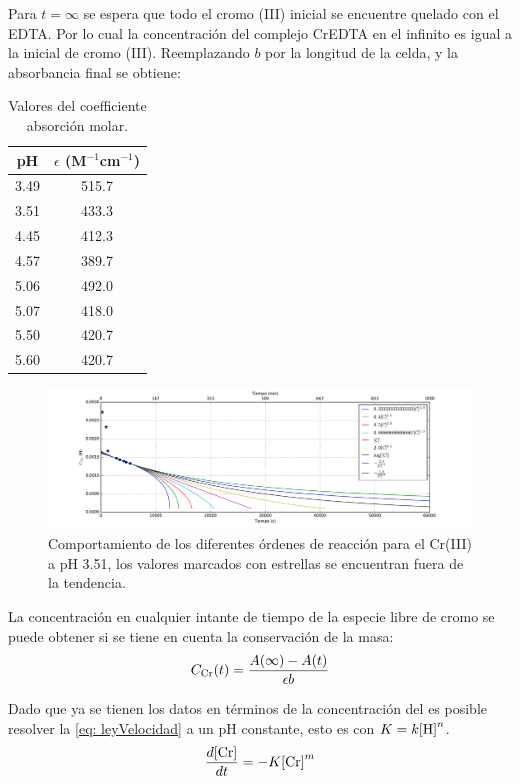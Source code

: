 \documentclass[fleqn,10pt]{SelfArx} %
\begin{document}
	Para $t = \infty$ se espera que todo el cromo (III) inicial se encuentre quelado con el EDTA. Por lo cual la concentraci\'on del complejo CrEDTA en el infinito es igual a la inicial de cromo (III). Reemplazando $b$ por la longitud de la celda, y la absorbancia final se obtiene:
	\begin{table}[h]
	    \centering
	    \caption{Valores del coefficiente absorci\'on molar.}
	    \begin{tabular}{cc}
	        \hline
	        pH & $\epsilon$ (M$^{-1}$cm$^{-1}$)\\
	        \hline
	        3.49 & 515.7 \\
	        3.51 & 433.3 \\
	        4.45 & 412.3 \\
	        4.57 & 389.7 \\
	        5.06 & 492.0 \\
	        5.07 & 418.0 \\
	        5.50 & 420.7 \\
	        5.60 & 420.7 \\
	        \hline
	    \end{tabular}
	    \label{tab: epsilon}
	\end{table}
	\begin{figure}[!ht]
	    \centering
	    \includegraphics[width=\linewidth]{images/integrationLaws.pdf}
	    \caption{Comportamiento de los diferentes \'ordenes de reacci\'on para el Cr(III) a pH 3.51, los valores marcados con estrellas se encuentran fuera de la tendencia.}
	    \label{fig: integrationLaws}
	\end{figure}
	
	\pagebreak
	La concentraci\'on en cualquier intante de tiempo de la especie libre de cromo se puede obtener si se tiene en cuenta la conservaci\'on de la masa:
	\begin{equation}
	    C_{\ce{Cr}}(t) = \dfrac{A(\infty)-A(t)}{\epsilon b}
	\end{equation}
	
	Dado que ya se tienen los datos en t\'erminos de la concentraci\'on del  es posible resolver la \autoref{eq: leyVelocidad} a un pH constante, esto es con $K=k\ce{[H]}^n$.
	\begin{equation}
	    \dfrac{d\ce{[Cr]}}{dt} = -K\ce{[Cr]}^m
	\end{equation}
	
\end{document}
